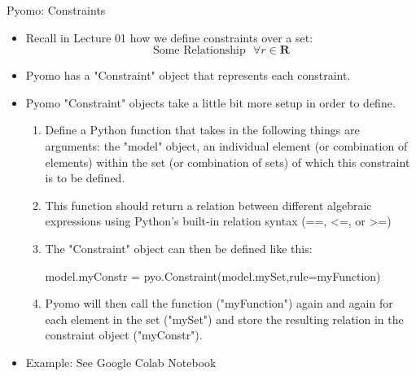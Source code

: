 \documentclass[10pt, aspectratio=169]{beamer}
\begin{document}
\begin{frame}{Pyomo: Constraints}
    \begin{itemize}
        \item Recall in Lecture 01 how we define constraints over a set:
        $$\text{Some\ Relationship} \ \ \ \forall r \in \textbf{R}$$
        \item Pyomo has a "Constraint" object that represents each constraint.
        \item Pyomo "Constraint" objects take a little bit more setup in order to define.
        \begin{enumerate}
            \item Define a Python function that takes in the following things are arguments: the "model" object, an individual element (or combination of elements) within the set (or combination of sets) of which this constraint is to be defined.
            \item This function should return a relation between different algebraic expressions using Python's built-in relation syntax (==, \textless=, or \textgreater=)
            \item The "Constraint" object can then be defined like this:
            
            \hspace{0.25cm} model.myConstr = pyo.Constraint(model.mySet,rule=myFunction)

            \item Pyomo will then call the function ("myFunction") again and again for each element in the set ("mySet") and store the resulting relation in the constraint object ("myConstr").
        \end{enumerate}
        \item Example: See Google Colab Notebook
    \end{itemize}
\end{frame}
\end{document}
